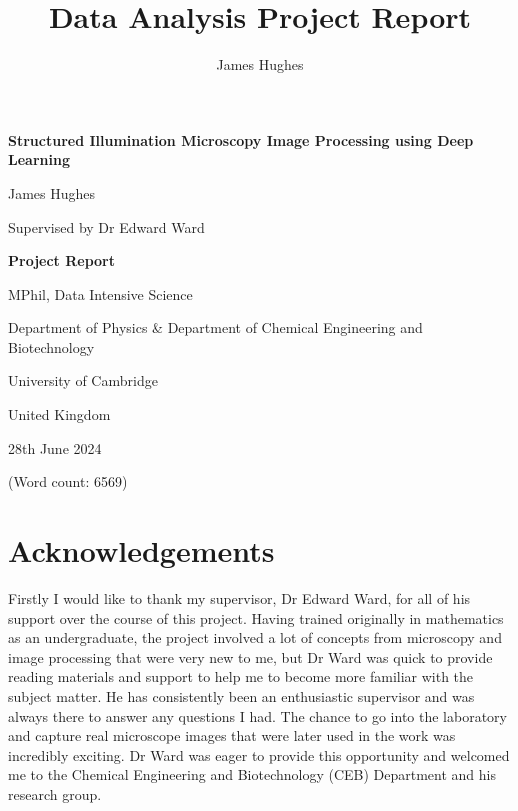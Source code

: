 \documentclass[12pt]{article}
\title{Data Analysis Project Report}
\author{James Hughes}
\begin{document}
\begin{titlepage}
    \begin{center}
        \vspace*{5cm}

        \Huge
        \textbf{Structured Illumination Microscopy Image Processing using Deep Learning}

        \vspace{0.5cm}
        \LARGE

        James Hughes

        Supervised by Dr Edward Ward

        \vspace{2cm}
        \Huge
        \textbf{Project Report}

        \vfill

        MPhil, Data Intensive Science

        \vspace{0.8cm}

        \Large
        Department of Physics \& Department of Chemical Engineering and Biotechnology

        University of Cambridge

        United Kingdom

        28th June 2024

        (Word count: 6569)

    \end{center}
\end{titlepage}


\newpage
\section*{Acknowledgements}

Firstly I would like to thank my supervisor, Dr Edward Ward, for all of his support over the course of this project.
Having trained originally in mathematics as an undergraduate,
the project involved a lot of concepts from microscopy and image processing that were very new to me,
but Dr Ward was quick to provide reading materials and support to help me to become more familiar with the subject matter.
He has consistently been an enthusiastic supervisor and was always there to answer any questions I had.
The chance to go into the laboratory and capture real microscope images that were later used in the work was incredibly exciting.
Dr Ward was eager to provide this opportunity and welcomed me to the Chemical Engineering and Biotechnology (CEB) Department and his research group.
\end{document}
